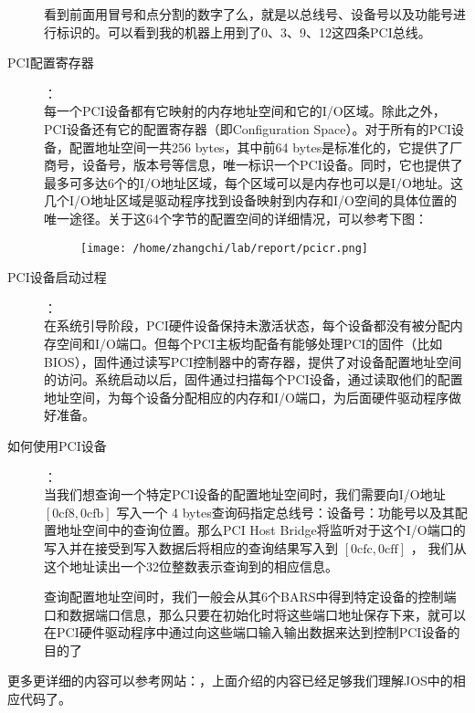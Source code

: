 \documentclass{article}
\begin{document}
\begin{CJK*}{UTF8}{gkai}
\begin{description}
看到前面用冒号和点分割的数字了么，就是以总线号、设备号以及功能号进行标识的。可以看到我的机器上用到了0、3、9、12这四条PCI总线。

\item[PCI配置寄存器]：\\

每一个PCI设备都有它映射的内存地址空间和它的I/O区域。除此之外，PCI设备还有它的配置寄存器（即Configuration Space）。对于所有的PCI设备，配置地址空间一共256 bytes，其中前64 bytes是标准化的，它提供了厂商号，设备号，版本号等信息，唯一标识一个PCI设备。同时，它也提供了最多可多达6个的I/O地址区域，每个区域可以是内存也可以是I/O地址。这几个I/O地址区域是驱动程序找到设备映射到内存和I/O空间的具体位置的唯一途径。关于这64个字节的配置空间的详细情况，可以参考下图：

\begin{figure}[htp]
\centering
\texttt{[image: /home/zhangchi/lab/report/pcicr.png]}
\end{figure}

\item[PCI设备启动过程]：\\


在系统引导阶段，PCI硬件设备保持未激活状态，每个设备都没有被分配内存空间和I/O端口。但每个PCI主板均配备有能够处理PCI的固件（比如BIOS），固件通过读写PCI控制器中的寄存器，提供了对设备配置地址空间的访问。系统启动以后，固件通过扫描每个PCI设备，通过读取他们的配置地址空间，为每个设备分配相应的内存和I/O端口，为后面硬件驱动程序做好准备。


\item[如何使用PCI设备]：\\

当我们想查询一个特定PCI设备的配置地址空间时，我们需要向I/O地址$[\mathrm{0cf8}, \mathrm{0cfb}]$ 写入一个 4 bytes查询码指定总线号：设备号：功能号以及其配置地址空间中的查询位置。那么PCI Host Bridge将监听对于这个I/O端口的写入并在接受到写入数据后将相应的查询结果写入到 $[\mathrm{0cfc}, \mathrm{0cff}]$ ， 我们从这个地址读出一个32位整数表示查询到的相应信息。

查询配置地址空间时，我们一般会从其6个BARS中得到特定设备的控制端口和数据端口信息，那么只要在初始化时将这些端口地址保存下来，就可以在PCI硬件驱动程序中通过向这些端口输入输出数据来达到控制PCI设备的目的了

\end{description}

更多更详细的内容可以参考网站：，上面介绍的内容已经足够我们理解JOS中的相应代码了。


\end{CJK*}
\end{document}
